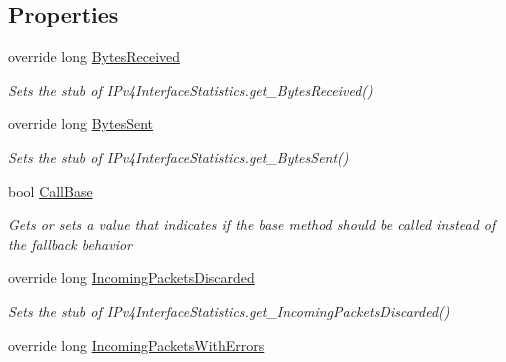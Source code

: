 \subsection*{Properties}
\begin{DoxyCompactItemize}
\item 
override long \hyperlink{class_system_1_1_net_1_1_network_information_1_1_fakes_1_1_stub_i_pv4_interface_statistics_a55c3db5bed32a6234301d49092962127}{Bytes\-Received}
\begin{DoxyCompactList}\small\item\em Sets the stub of I\-Pv4\-Interface\-Statistics.\-get\-\_\-\-Bytes\-Received()\end{DoxyCompactList}\item 
override long \hyperlink{class_system_1_1_net_1_1_network_information_1_1_fakes_1_1_stub_i_pv4_interface_statistics_aebb4b2866ec3f9705beaa1ce5c6ae8f5}{Bytes\-Sent}
\begin{DoxyCompactList}\small\item\em Sets the stub of I\-Pv4\-Interface\-Statistics.\-get\-\_\-\-Bytes\-Sent()\end{DoxyCompactList}\item 
bool \hyperlink{class_system_1_1_net_1_1_network_information_1_1_fakes_1_1_stub_i_pv4_interface_statistics_a22a603f807eeed155ced912de3887398}{Call\-Base}
\begin{DoxyCompactList}\small\item\em Gets or sets a value that indicates if the base method should be called instead of the fallback behavior\end{DoxyCompactList}\item 
override long \hyperlink{class_system_1_1_net_1_1_network_information_1_1_fakes_1_1_stub_i_pv4_interface_statistics_ad5e2642a19d31eee1287999a3daa671f}{Incoming\-Packets\-Discarded}
\begin{DoxyCompactList}\small\item\em Sets the stub of I\-Pv4\-Interface\-Statistics.\-get\-\_\-\-Incoming\-Packets\-Discarded()\end{DoxyCompactList}\item 
override long \hyperlink{class_system_1_1_net_1_1_network_information_1_1_fakes_1_1_stub_i_pv4_interface_statistics_a3c95baf322d0e3c6737719b75c4c0384}{Incoming\-Packets\-With\-Errors}

\end{DoxyCompactItemize}
